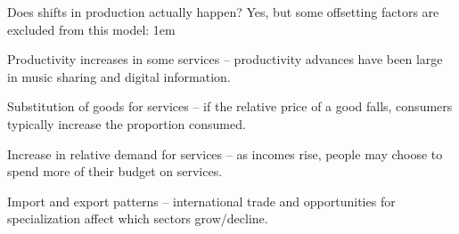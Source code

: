 \documentclass[11pt,aspectratio=43,usenames,dvipsnames]{beamer}
\let\olditemize=\itemize
\let\endolditemize=\enditemize
\renewenvironment{itemize}{\olditemize \itemsep1em}{\endolditemize}
\theoremstyle{definition}
\begin{document}
\begin{frame}{Does shifts in production actually happen?}
\label{slide:Does_shifts_in_production_actually_happen_}
    Yes, but some offsetting factors are excluded from this model:
    \begin{itemize}
        \item<1-4> Productivity increases in some services – productivity advances have been large in music sharing and digital information.
        \item<2-4> Substitution of goods for services – if the relative price of a good falls, consumers typically increase the proportion consumed.
        \item<3-4> Increase in relative demand for services – as incomes rise, people may choose to spend more of their budget on services.
        \item<4-4> Import and export patterns – international trade and opportunities for specialization affect which sectors grow/decline.
    \end{itemize}

\end{frame}



%
%
\end{document}
